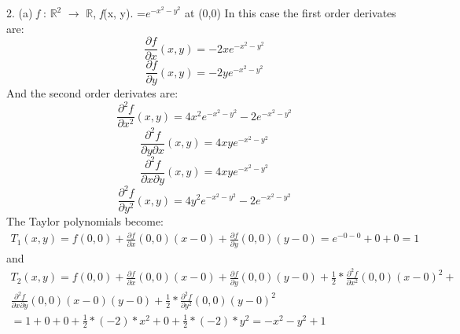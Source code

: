 \documentclass[a4paper,12pt]{article}
\begin{document}
\vspace{1cm} 
2. (a) \emph{f} : $\mathbb{R}^2$ $\to$  $\mathbb{R}$, \emph{f}(x, y). 
=$e^{-x^2-y^2}$ at (0,0)  \newline
In this case the first order derivates are: 
\begin{equation*}
\frac{\partial f}{\partial x}(x, y) = -2xe^{-x^2 - y^2}
\end{equation*}
\begin{equation*}
\frac{\partial f}{\partial y}(x, y) = -2ye^{-x^2 - y^2}
\end{equation*}
And the second order derivates are:
\begin{equation*}
\frac{\partial^2 f}{\partial x^2}(x, y) = 4x^2e^{-x^2-y^2} - 2e^{-x^2-y^2}
\end{equation*}
\begin{equation*}
\frac{\partial^2 f}{\partial y\partial x}(x, y) = 4xye^{-x^2-y^2}
\end{equation*}
\begin{equation*}
\frac{\partial^2 f}{\partial x\partial y}(x, y) = 4xye^{-x^2-y^2}
\end{equation*}
\begin{equation*}
\frac{\partial^2 f}{\partial y^2}(x, y) = 4y^2e^{-x^2-y^2} - 2e^{-x^2-y^2}
\end{equation*} \newline
The Taylor polynomials become:
\begin{multline*}
T_{1}(x,y) =  f(0,0) + \frac{\partial f}{\partial x}(0, 0)(x - 0)
+ \frac{\partial f}{\partial y}(0, 0)(y - 0) 
=  e^{-0 - 0} + 0 + 0 = 1
\end{multline*}
and
\begin{multline*}
T_{2}(x,y) = f(0, 0) + 
	\frac{\partial f}{\partial x}(0, 0)(x - 0) + 
	\frac{\partial f}{\partial y}(0, 0)(y - 0) + 
	\frac{1}{2} * \frac{\partial^2 f}{\partial x^2}(0, 0)(x - 0)^2  + \\
	\frac{\partial^2 f}{\partial x\partial y}(0, 0)(x - 0)(y - 0) +
	\frac{1}{2} * \frac{\partial^2 f}{\partial y^2}(0, 0)(y - 0)^2  \\
= 1 + 0 + 0 + \frac{1}{2}*(-2)*x^2 + 0 + \frac{1}{2}*(-2)*y^2 
= -x^2 - y^2 + 1
\end{multline*}
\end{document}
